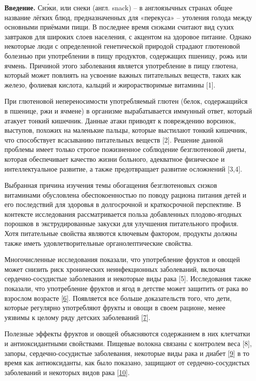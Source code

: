 {{\bfseries Введение.} Снэ́ки, или снеки (англ. snack) -- в англоязычных
странах общее название лёгких блюд, предназначенных для «перекуса» --
утоления голода между основными приёмами пищи. В последнее время снэками
считают вид сухих завтраков для широких слоев населения, с акцентом на
здоровое питание. Однако некоторые люди с определенной генетической
природой страдают глютеновой болезнью при употреблении в пищу продуктов,
содержащих пшеницу, рожь или ячмень. Причиной этого заболевания является
употребление в пищу глютена, который может повлиять на усвоение важных
питательных веществ, таких как железо, фолиевая кислота, кальций и
жирорастворимые витамины {[}1{]}.

При глютеновой непереносимости употребляемый глютен (белок, содержащийся
в пшенице, ржи и ячмене) в организме вырабатывается иммунный ответ,
который атакует тонкий кишечник. Данные атаки приводят к повреждению
ворсинок, выступов, похожих на маленькие пальцы, которые выстилают
тонкий кишечник, что способствует всасыванию питательных веществ
{[}2{]}. Решение данной проблемы имеет только строгое пожизненное
соблюдение безглютеновой диеты, которая обеспечивает качество жизни
больного, адекватное физическое и интеллектуальное развитие, а также
предотвращает развитие осложнений {[}3,4{]}.

Выбранная причина изучения темы обогащения безглютеновых снэков
витаминами обусловлена обеспокоенностью по поводу рациона питания детей
и его последствий для здоровья в долгосрочной и краткосрочной
перспективе. В контексте исследования рассматривается польза добавленных
плодово-ягодных порошков в экструдированные закуски для улучшения
питательного профиля. Хотя питательные свойства являются ключевым
фактором, продукты должны также иметь удовлетворительные
органолептические свойства.

Многочисленные исследования показали, что употребление фруктов и овощей
может снизить риск хронических неинфекционных заболеваний, включая
сердечно-сосудистые заболевания и некоторые виды рака {[}5{]}.
Исследования также показали, что употребление фруктов и ягод в детстве
может защитить от рака во взрослом возрасте
{[}\href{https://www.sciencedirect.com/science/article/pii/S002364381200463X\#bib35}{6}{]}.
Появляется все больше доказательств того, что дети, которые регулярно
употребляют фрукты и овощи в своем рационе, менее уязвимы к целому ряду
детских заболеваний
{[}\href{https://www.sciencedirect.com/science/article/pii/S002364381200463X\#bib4}{7}{]}.

Полезные эффекты фруктов и овощей объясняются содержанием в них
клетчатки и антиоксидантными свойствами. Пищевые волокна связаны с
контролем веса {[}8{]}, запоры, сердечно-сосудистые заболевания,
некоторые виды рака и диабет
{[}\href{https://www.sciencedirect.com/science/article/pii/S002364381200463X\#bib23}{9}{]}
в то время как антиоксиданты, как было показано, защищают от
сердечно-сосудистых заболеваний и некоторых видов рака
{[}\href{https://www.sciencedirect.com/science/article/pii/S002364381200463X\#bib3}{10}{]}.

}
